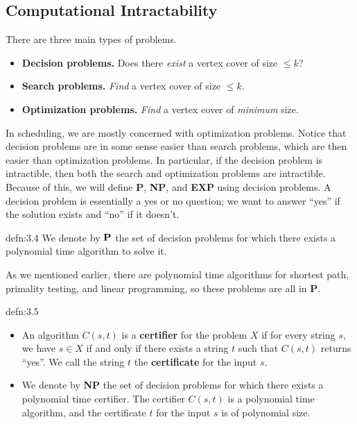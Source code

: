 \subsection{Computational Intractability}\label{subsec:3.2}
There are three main types of problems. 
\begin{itemize}
    \item {\bf Decision problems.} Does there \emph{exist} a vertex cover of 
    size $\leq k$?
    \item {\bf Search problems.} \emph{Find} a vertex cover of size $\leq k$. 
    \item {\bf Optimization problems.} \emph{Find} a vertex cover of 
    \emph{minimum} size. 
\end{itemize}
In scheduling, we are mostly concerned with optimization problems. Notice that 
decision problems are in some sense easier than search problems, which are then 
easier than optimization problems. In particular, if the decision problem 
is intractible, then both the search and optimization problems are intractible.
Because of this, we will define {\bf P}, {\bf NP}, and {\bf EXP} using decision 
problems. A decision problem is essentially a yes or no question; we want to 
answer ``yes'' if the solution exists and ``no'' if it doesn't. 

\begin{defn}{defn:3.4}
    We denote by ${\bf P}$ the set of decision problems for which there 
    exists a polynomial time algorithm to solve it. 
\end{defn}

As we mentioned earlier, there are polynomial time algorithms for shortest 
path, primality testing, and linear programming, so these problems are all 
in {\bf P}. 

\begin{defn}{defn:3.5}
    \begin{itemize}
        \item An algorithm $C(s, t)$ is a {\bf certifier} for the problem $X$ if 
        for every string $s$, we have $s \in X$ if and only if there exists a 
        string $t$ such that $C(s, t)$ returns ``yes''. We call the string $t$ 
        the {\bf certificate} for the input $s$. 
        \item We denote by {\bf NP} the set of decision problems for which there exists 
        a polynomial time certifier. The certifier $C(s, t)$ is a 
        polynomial time algorithm, and the certificate $t$ for the input 
        $s$ is of polynomial size. 
    \end{itemize}
\end{defn}

